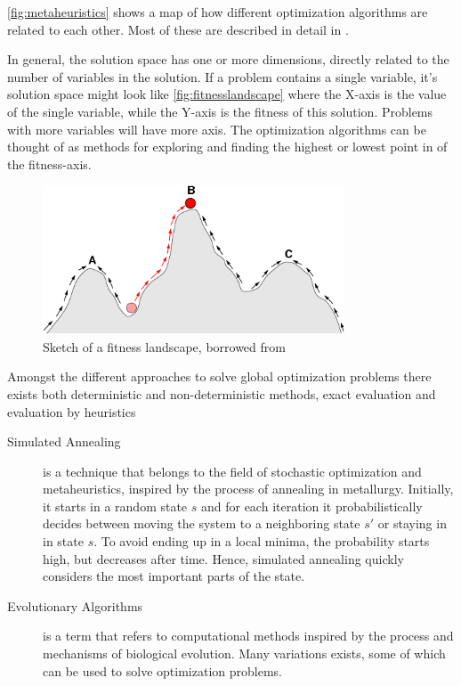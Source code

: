 \autoref{fig:metaheuristics} shows a map of how different optimization algorithms are related to
each other. Most of these are described in detail in \cite{russellnorvig}.

In general, the solution space has one or more dimensions, directly related to
the number of variables in the solution. If a problem contains a single variable,
it's solution space might look like \autoref{fig:fitnesslandscape} where the X-axis is
the value of the single variable, while the Y-axis is the fitness of this solution. Problems
with more variables will have more axis. The optimization algorithms can be thought of as
methods for exploring and finding the highest or lowest point in of the fitness-axis.

\begin{figure}
    \centering
    \includegraphics[width=0.8\textwidth]{figs/Fitness-landscape-cartoon.png}
    \caption{Sketch of a fitness landscape, borrowed from \cite{wikifitnesslandscape}}
    \label{fig:fitnesslandscape}
\end{figure}

Amongst the different approaches to solve global optimization problems there
exists both deterministic and non-deterministic methods, exact evaluation and
evaluation by heuristics

\begin{description}
    \item[Simulated Annealing] is a technique that belongs to the field of
        stochastic optimization and metaheuristics, inspired by the process of
        annealing in metallurgy. Initially, it starts in a random state $s$ and
        for each iteration it probabilistically decides between moving the
        system to a neighboring state $s'$ or staying in in state $s$. To avoid
        ending up in a local minima, the probability starts high, but decreases
        after time. Hence, simulated annealing quickly considers the most
        important parts of the state.
    \item[Evolutionary Algorithms] is a term that refers to computational
        methods inspired by the process and mechanisms of biological evolution.
        Many variations exists, some of which can be used to solve optimization
        problems.

\end{description}


